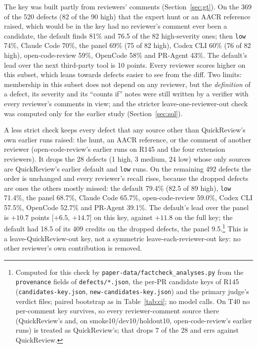 \documentclass[11pt,a4paper]{article}
\newcommand{\qcr}{QuickReview}
\newcommand{\code}[1]{\texttt{#1}}
\begin{document}
The key was built partly from reviewers' comments (Section~\ref{sec:gt}).
On the 369 of the 520 defects (82 of the 90 high) that the expert hunt or an
AACR reference raised, which would be in the key had no reviewer's comment
ever been a candidate, the default finds 81\% and 76.5 of the 82
high-severity ones; then \code{low} 74\%, Claude Code 70\%, the panel 69\%
(75 of 82 high), Codex CLI 60\% (76 of 82 high), open-code-review 59\%,
OpenCode 58\% and PR-Agent 43\%. The default's lead over the next third-party
tool is 10 points. Every reviewer scores higher on this subset, which leans
towards defects easier to see from the diff. Two limits: membership in this
subset does not depend on any reviewer, but the \emph{definition} of a
defect, its severity and its ``counts if'' notes were still written by a
verifier with every reviewer's comments in view; and the stricter
leave-one-reviewer-out check was computed only for the earlier study
(Section~\ref{sec:sol}).

A less strict check keeps every defect that any source other than \qcr{}'s
own earlier runs raised: the hunt, an AACR reference, or the comment of
another reviewer (open-code-review's earlier runs on R145 and the four
extension reviewers). It drops the 28 defects (1 high, 3 medium, 24 low)
whose only sources are \qcr{}'s earlier default and \code{low} runs. On the
remaining 492 defects the order is unchanged and every reviewer's recall
rises, because the dropped defects are ones the others mostly missed: the
default 79.4\% (82.5 of 89 high), \code{low} 71.4\%, the panel 68.7\%,
Claude Code 65.7\%, open-code-review 59.0\%, Codex CLI 57.5\%, OpenCode
52.7\% and PR-Agent 39.1\%. The default's lead over the panel is $+10.7$
points [$+6.5$, $+14.7$] on this key, against $+11.8$ on the full key; the
default had 18.5 of its 409 credits on the dropped defects, the panel
9.5.\footnote{Computed for this check by
\code{paper-data/factcheck\_analyses.py} from the \code{provenance} fields
of \code{defects/*.json}, the per-PR candidate keys of R145
(\code{candidates-key.json}, \code{new-candidates-key.json}) and the
primary judge's verdict files; paired bootstrap as in Table~\ref{tab:ci}; no
model calls. On T40 no per-comment key survives, so every reviewer-comment
source there (\qcr{}'s and, on smoke10/dev10/holdout10, open-code-review's
earlier runs) is treated as \qcr{}'s; that drops 7 of the 28 and errs
against \qcr{}.} This is a leave-\qcr{}-out key, not a symmetric
leave-each-reviewer-out key: no other reviewer's own contribution is
removed.
\end{document}
